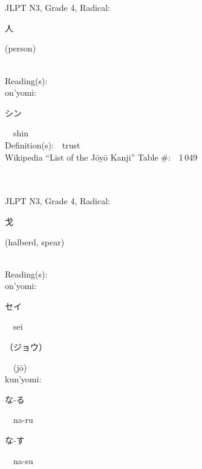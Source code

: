 \begin{multicols}{2}
\ \ \\
{\fontsize{34pt}{40pt}  }\ \ \\  %
{JLPT N3, Grade 4, Radical:\ \ {\begin{CJK}{UTF8}{min} 人 \end{CJK}} (person) } \\
Reading(s):\ \ \\
{\hspace*{1em}}on'yomi:\ \ \\
{\hspace*{2em}}{\begin{CJK}{UTF8}{min} シン \end{CJK}}\ \ shin\ \ \\
Definition(s):\ \ trust \\
Wikipedia ``List of the J\=oy\=o Kanji'' Table \#:\ \ 1\,049 \\
\ \ \\
{\fontsize{34pt}{40pt}  }\ \ \\  %
{JLPT N3, Grade 4, Radical:\ \ {\begin{CJK}{UTF8}{min} 戈 \end{CJK}} (halberd, spear) } \\
Reading(s):\ \ \\
{\hspace*{1em}}on'yomi:\ \ \\
{\hspace*{2em}}{\begin{CJK}{UTF8}{min} セイ \end{CJK}}\ \ sei\ \ \\
{\hspace*{2em}}{\begin{CJK}{UTF8}{min} （ジョウ） \end{CJK}}\ \ (j\=o)\ \ \\
{\hspace*{1em}}kun'yomi:\ \ \\
{\hspace*{2em}}{\begin{CJK}{UTF8}{min} な-る \end{CJK}}\ \ na-ru\ \ \\
{\hspace*{2em}}{\begin{CJK}{UTF8}{min} な-す \end{CJK}}\ \ na-su\ \ \\

\end{multicols}

